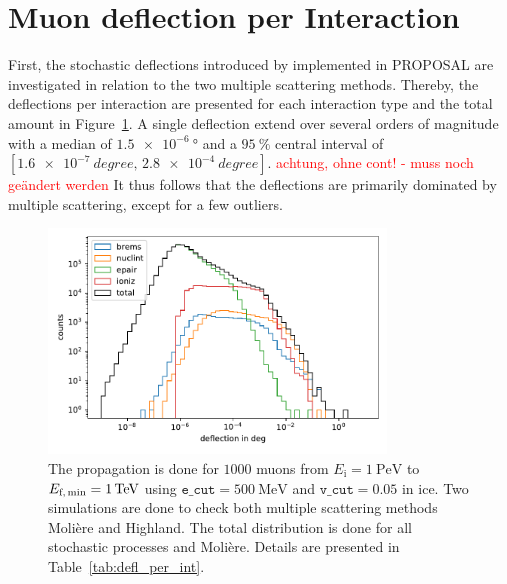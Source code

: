\section{Muon deflection per Interaction}\label{sec:defl_per_int}
First, the stochastic deflections introduced by \cite{Van_Ginneken} implemented 
in PROPOSAL are investigated in relation to the two multiple scattering methods. Thereby, the deflections per interaction are presented 
for each interaction type and the total amount in Figure~\ref{fig:defl_per_int}. A single deflection 
extend over several orders of magnitude with a median of $\SI{1.5e-6}{\degree}$
and a $\SI{95}{\percent}$ central interval of $[\SI{1.6e-7}{degree}, \,\SI{2.8e-4}{degree}]$. \textcolor{red}{achtung, ohne cont! - muss noch geändert werden}
It thus follows that the deflections are primarily dominated by multiple scattering, except for a few outliers. 

\begin{figure}
    \centering 
    \includegraphics[width=0.8\textwidth]{figures/1PeV_1TeV_1000events.pdf}
    \caption{The propagation is done for $\num{1000}$ 
    muons from $E_{\text{i}} = \SI{1}{\peta\electronvolt}$ to $E_{\text{f,\,min}} = \SI{1}{\tera\electronvolt}$ using $\texttt{e\_cut} = \SI{500}{\mega\electronvolt}$ and $\texttt{v\_cut} = 0.05$ in ice. Two simulations 
    are done to check both multiple scattering methods Molière and Highland. The total distribution is done for all stochastic processes and Molière. Details are presented in 
    Table~\ref{tab:defl_per_int}.}
    \label{fig:defl_per_int}
\end{figure}

